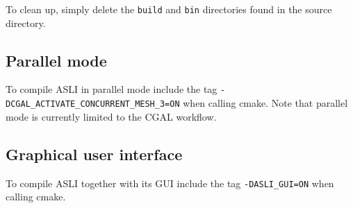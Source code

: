 To clean up, simply delete the \texttt{build} and \texttt{bin} directories found in the source directory.

\subsection{Parallel mode}
To compile ASLI in parallel mode include the tag \verb|-DCGAL_|\hspace{0pt}\verb|ACTIVATE_|\hspace{0pt}\verb|CONCURRENT_|\hspace{0pt}\verb|MESH_3=ON| when calling cmake. Note that parallel mode is currently limited to the CGAL workflow.

\subsection{Graphical user interface}
To compile ASLI together with its GUI include the tag \verb|-DASLI_GUI=ON| when calling cmake.
